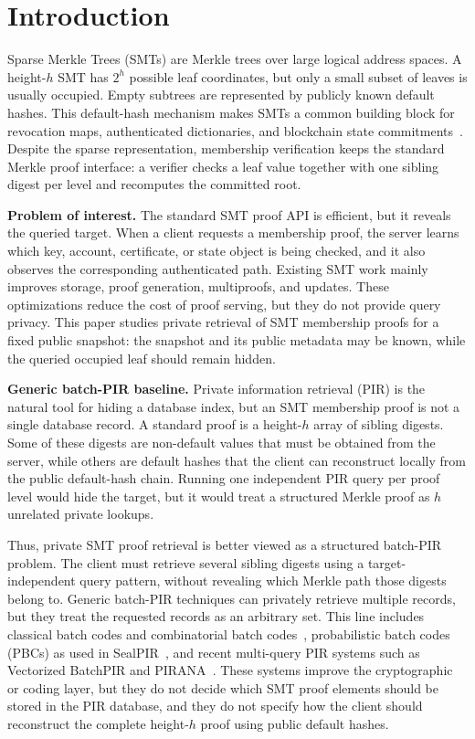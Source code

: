\section{Introduction}
\label{sec:intro}

Sparse Merkle Trees (SMTs) are Merkle trees over large logical address spaces. A height-$h$ SMT has $2^h$ possible leaf coordinates, but only a small subset of leaves is usually occupied. Empty subtrees are represented by publicly known default hashes. This default-hash mechanism makes SMTs a common building block for revocation maps, authenticated dictionaries, and blockchain state commitments~\cite{sparsemt,revtrans,jmt,ethereum,zcash}. Despite the sparse representation, membership verification keeps the standard Merkle proof interface: a verifier checks a leaf value together with one sibling digest per level and recomputes the committed root.

\textbf{Problem of interest.} The standard SMT proof API is efficient, but it reveals the queried target. When a client requests a membership proof, the server learns which key, account, certificate, or state object is being checked, and it also observes the corresponding authenticated path. Existing SMT work mainly improves storage, proof generation, multiproofs, and updates. These optimizations reduce the cost of proof serving, but they do not provide query privacy. This paper studies private retrieval of SMT membership proofs for a fixed public snapshot: the snapshot and its public metadata may be known, while the queried occupied leaf should remain hidden.

\textbf{Generic batch-PIR baseline.} Private information retrieval (PIR) is the natural tool for hiding a database index, but an SMT membership proof is not a single database record. A standard proof is a height-$h$ array of sibling digests. Some of these digests are non-default values that must be obtained from the server, while others are default hashes that the client can reconstruct locally from the public default-hash chain. Running one independent PIR query per proof level would hide the target, but it would treat a structured Merkle proof as $h$ unrelated private lookups.

Thus, private SMT proof retrieval is better viewed as a structured batch-PIR problem. The client must retrieve several sibling digests using a target-independent query pattern, without revealing which Merkle path those digests belong to. Generic batch-PIR techniques can privately retrieve multiple records, but they treat the requested records as an arbitrary set. This line includes classical batch codes and combinatorial batch codes~\cite{batchcodes,cbc}, probabilistic batch codes (PBCs) as used in SealPIR~\cite{sealpir}, and recent multi-query PIR systems such as Vectorized BatchPIR and PIRANA~\cite{vectorbatchpir,pirana}. These systems improve the cryptographic or coding layer, but they do not decide which SMT proof elements should be stored in the PIR database, and they do not specify how the client should reconstruct the complete height-$h$ proof using public default hashes.

